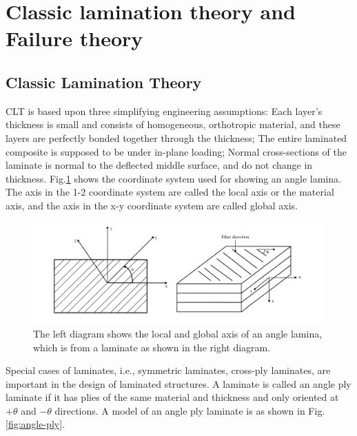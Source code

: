 \section{Classic lamination theory and Failure theory}

\subsection{Classic Lamination Theory}
CLT is based upon three simplifying engineering assumptions: Each layer’s
thickness is small and consists of homogeneous, orthotropic material, and these
layers are perfectly bonded together through the thickness; The entire
laminated composite is supposed to be under in-plane loading; Normal
cross-sections of the laminate is normal to the deflected middle surface, and
do not change in thickness. Fig.\ref{fig:lamina_local_and_global} shows the
coordinate system used for showing an angle lamina. The axis in the 1-2
coordinate system are called the local axis or the material axis, and the axis
in the x-y coordinate system are called global axis.

\begin{figure}[ht]
	\includegraphics[width=1\linewidth]{fig/lamina_local_global_axes.png}
	\caption{The left diagram shows the local and global axis of an angle lamina, which is from a laminate as shown in the right diagram.}
	\label{fig:lamina_local_and_global}
\end{figure}

Special cases of laminates, i.e., symmetric laminates, cross-ply laminates, are
important in the design of laminated structures. A laminate is called an angle
ply laminate if it has plies of the same material and thickness and only
oriented at $+\theta$ and $-\theta$ directions. A model of an angle ply
laminate is as shown in Fig.\ref{fig:angle-ply}.  



